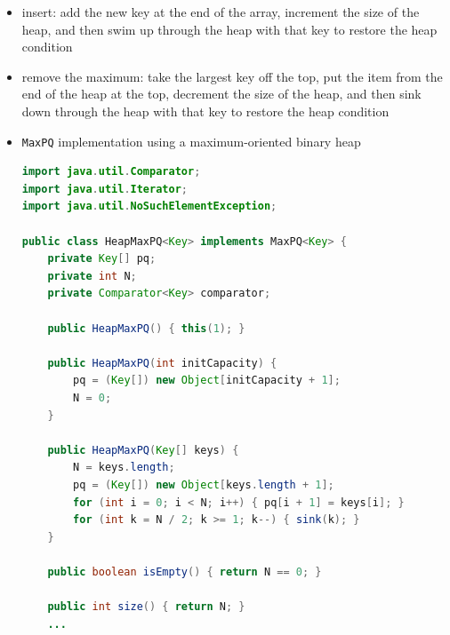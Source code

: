 \documentclass[8pt,a4paper,compress]{beamer}
\begin{document}
\begin{frame}[fragile]
\begin{itemize}
\item insert: add the new key at the end of the array, increment the size of the heap, and then swim up through the heap with that key to restore the heap condition

\item remove the maximum: take the largest key off the top, put the item from the end of the heap at the top, decrement the size of the heap, and then sink down through the heap with that key to restore the heap condition

\item \lstinline{MaxPQ} implementation using a maximum-oriented binary heap
\begin{lstlisting}[language=Java]
import java.util.Comparator;
import java.util.Iterator;
import java.util.NoSuchElementException;

public class HeapMaxPQ<Key> implements MaxPQ<Key> {
    private Key[] pq;
    private int N;
    private Comparator<Key> comparator; 
    
    public HeapMaxPQ() { this(1); }

    public HeapMaxPQ(int initCapacity) {
        pq = (Key[]) new Object[initCapacity + 1];
        N = 0;
    }

    public HeapMaxPQ(Key[] keys) {
        N = keys.length;
        pq = (Key[]) new Object[keys.length + 1]; 
        for (int i = 0; i < N; i++) { pq[i + 1] = keys[i]; }
        for (int k = N / 2; k >= 1; k--) { sink(k); }
    }
    
    public boolean isEmpty() { return N == 0; }

    public int size() { return N; }
    ...
\end{lstlisting}
\end{itemize}
\end{frame}
\end{document}
